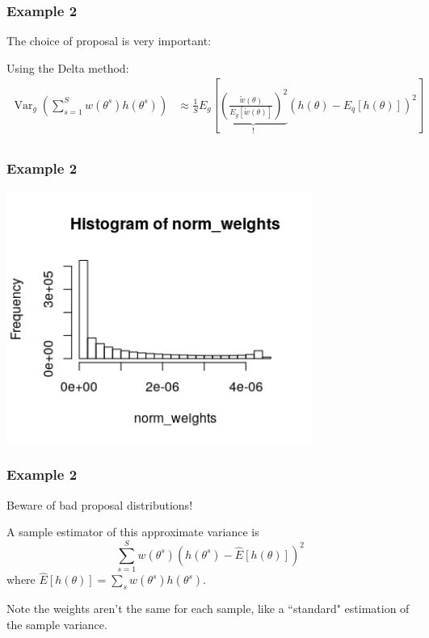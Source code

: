 \documentclass{beamer}
\begin{document}
\begin{frame}[fragile]
\frametitle{Example 2}

The choice of proposal is very important:
\newline

Using the Delta method:
\begin{align*}
\operatorname{Var}_g \left( \sum_{s=1}^S w(\theta^s) h(\theta^s) \right) &\approx \frac{1}{S} E_g\left[  \underbrace{ \left(\frac{\tilde{w}(\theta)}{ E_g[\tilde{w}(\theta)] }\right)^2 }_{\text{!} } (h(\theta) - E_q[h(\theta) ] )^2 \right]    \\
\end{align*}

\end{frame}

\begin{frame}[fragile]
\frametitle{Example 2}

\begin{center}
\includegraphics[width=100mm]{is_weights.png}
\end{center}

\end{frame}


\begin{frame}[fragile]
\frametitle{Example 2}

Beware of bad proposal distributions!
\newline

A sample estimator of this approximate variance is
\[
\sum_{s=1}^S w(\theta^s) \left( h(\theta^s) - \hat{E}[h(\theta)]  \right)^2
\]
where $\hat{E}[h(\theta)] = \sum_s w(\theta^s)h(\theta^s)$. 
\newline

Note the weights aren't the same for each sample, like a ``standard" estimation of the sample variance.

\end{frame}
\end{document}
